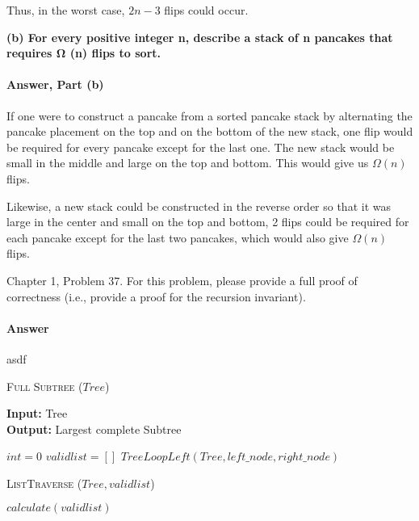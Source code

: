 \documentclass{article}
\begin{document}
Thus, in the worst case, $2n - 3$ flips could occur.

{\bf (b) For every positive integer n, describe a stack of n pancakes that requires
Ω (n) flips to sort.}

\paragraph{Answer, Part (b)}

If one were to construct a pancake from a sorted pancake stack by alternating the pancake placement on the
top and on the bottom of the new stack, one flip would be required for every pancake except for the last one.
The new stack would be small in the middle and large on the top and bottom. This would give us $\Omega(n)$ flips.

Likewise, a new stack could be constructed in the reverse order so that it was large in the center and small on
the top and bottom, 2 flips could be required for each pancake except for the last two pancakes, which would
also give $\Omega(n)$ flips.

\collab{\todo{}}

Chapter 1, Problem 37.  For this problem, please provide a full proof of
correctness (i.e., provide a proof for the recursion invariant).

\paragraph{Answer}
asdf

\begin{algorithm} \caption{\textsc{Full Subtree} ($Tree$)}\label{alg:seb}
    {\bf Input:} Tree\\
    {\bf Output:} Largest complete Subtree
    \begin{algorithmic}[1]
		\State$int=0$
		\State$valid list=[]$
        \State$TreeLoopLeft(Tree, left\_node, right\_node)$
    \end{algorithmic}
\end{algorithm}

\begin{algorithm} \caption{\textsc{ListTraverse} ($Tree, validlist$)}\label{alg:seb}
    \begin{algorithmic}[1]
        \State$calculate(validlist)$
    \end{algorithmic}
\end{algorithm}
\end{document}

